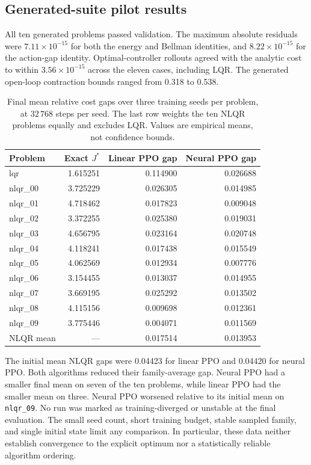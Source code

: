 \documentclass[11pt]{article}
\begin{document}
\subsection{Generated-suite pilot results}
\label{sec:energy-results}

All ten generated problems passed validation. The maximum absolute residuals were
$7.11\times10^{-15}$ for both the energy and Bellman identities, and
$8.22\times10^{-15}$ for the action-gap identity. Optimal-controller rollouts agreed
with the analytic cost to within $3.56\times10^{-15}$ across the eleven cases,
including LQR. The generated open-loop contraction bounds ranged from 0.318 to 0.538.

\begin{table}[H]
  \centering
  \begin{tabular}{@{}lrrr@{}}
    \toprule
    Problem & Exact $J^*$ & Linear PPO gap & Neural PPO gap \\
    \midrule
    lqr & 1.615251 & 0.114900 & 0.026688 \\
    nlqr\_00 & 3.725229 & 0.026305 & 0.014985 \\
    nlqr\_01 & 4.718462 & 0.017823 & 0.009048 \\
    nlqr\_02 & 3.372255 & 0.025380 & 0.019031 \\
    nlqr\_03 & 4.656795 & 0.023164 & 0.020748 \\
    nlqr\_04 & 4.118241 & 0.017438 & 0.015549 \\
    nlqr\_05 & 4.062569 & 0.012934 & 0.007776 \\
    nlqr\_06 & 3.154455 & 0.013037 & 0.014955 \\
    nlqr\_07 & 3.669195 & 0.025292 & 0.013502 \\
    nlqr\_08 & 4.115156 & 0.009698 & 0.012361 \\
    nlqr\_09 & 3.775446 & 0.004071 & 0.011569 \\
    \midrule
    NLQR mean & --- & 0.017514 & 0.013953 \\
    \bottomrule
  \end{tabular}
  \caption{Final mean relative cost gaps over three training seeds per problem,
  at $32\,768$ steps per seed. The last row weights the ten NLQR problems equally
  and excludes LQR. Values are empirical means, not confidence bounds.}
  \label{tab:energy-results}
\end{table}

The initial mean NLQR gaps were 0.04423 for linear PPO and 0.04420 for neural PPO.
Both algorithms reduced their family-average gap. Neural PPO had a smaller final
mean on seven of the ten problems, while linear PPO had the smaller mean on three.
Neural PPO worsened relative to its initial mean on \texttt{nlqr\_09}.
No run was marked as training-diverged or unstable at the final evaluation.
The small seed count, short training budget, stable sampled family, and single
initial state limit any comparison. In particular, these data neither establish
convergence to the explicit optimum nor a statistically reliable algorithm ordering.
\end{document}
